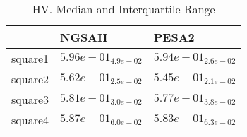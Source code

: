 \documentclass{article}
\begin{document}
\begin{table}
\caption{HV. Median and Interquartile Range}
\label{table: HV}
\centering
\begin{scriptsize}
\begin{tabular}{lll}
\hline & NGSAII &  PESA2\\
\hline 
square1 & \cellcolor{gray95}$  5.96e-01_{ 4.9e-02}$ & \cellcolor{gray25}$  5.94e-01_{ 2.6e-02}$ \\
square2 & \cellcolor{gray95}$  5.62e-01_{ 2.5e-02}$ & \cellcolor{gray25}$  5.45e-01_{ 2.1e-02}$ \\
square3 & \cellcolor{gray95}$  5.81e-01_{ 3.0e-02}$ & \cellcolor{gray25}$  5.77e-01_{ 3.8e-02}$ \\
square4 & \cellcolor{gray95}$  5.87e-01_{ 6.0e-02}$ & \cellcolor{gray25}$  5.83e-01_{ 6.3e-02}$ \\
\hline
\end{tabular}
\end{scriptsize}
\end{table}
\end{document}
